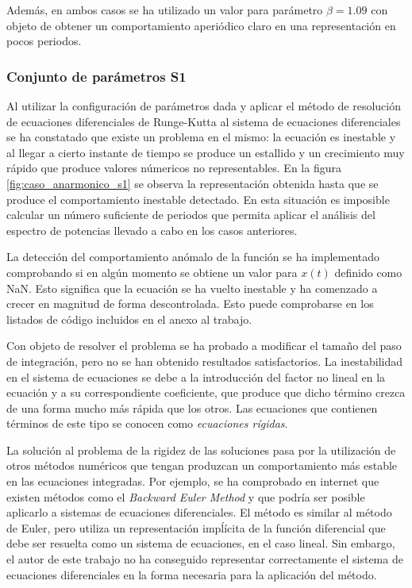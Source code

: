 \documentclass[11pt]{article}
\begin{document}
Además, en ambos casos se ha utilizado un valor para parámetro $\beta=1.09$ con objeto de obtener un comportamiento aperiódico claro en una representación en pocos periodos.

\subsubsection{Conjunto de parámetros S1}
Al utilizar la configuración de parámetros dada y aplicar el método de resolución de ecuaciones diferenciales de Runge-Kutta al sistema de ecuaciones diferenciales se ha constatado que existe un problema en el mismo: la ecuación es inestable y al llegar a cierto instante de tiempo se produce un estallido y un crecimiento muy rápido que produce valores númericos no representables. En la figura \ref{fig:caso_anarmonico_s1} se observa la representación obtenida hasta que se produce el comportamiento inestable detectado. En esta situación es imposible calcular un número suficiente de periodos que permita aplicar el análisis del espectro de potencias llevado a cabo en los casos anteriores.

La detección del comportamiento anómalo de la función se ha implementado comprobando si en algún momento se obtiene un valor para $x(t)$ definido como NaN. Esto significa que la ecuación se ha vuelto inestable y ha comenzado a crecer en magnitud de forma descontrolada. Esto puede comprobarse en los listados de código incluidos en el anexo al trabajo.

Con objeto de resolver el problema se ha probado a modificar el tamaño del paso de integración, pero no se han obtenido resultados satisfactorios. La inestabilidad en el sistema de ecuaciones se debe a la introducción del factor no lineal en la ecuación y a su correspondiente coeficiente, que produce que dicho término crezca de una forma mucho más rápida que los otros. Las ecuaciones que contienen términos de este tipo se conocen como \textit{ecuaciones rígidas}. 

La solución al problema de la rigidez de las soluciones pasa por la utilización de otros métodos numéricos que tengan produzcan un comportamiento más estable en las ecuaciones integradas. Por ejemplo, se ha comprobado en internet que existen métodos como el 
\textit{Backward Euler Method} y que podría ser posible aplicarlo a sistemas de ecuaciones diferenciales. El método es similar al método de Euler, pero utiliza un representación impĺícita de la función diferencial que debe ser resuelta como un sistema de ecuaciones, en el caso lineal. Sin embargo, el autor de este trabajo no ha conseguido representar correctamente el sistema de ecuaciones diferenciales en la forma necesaria para la aplicación del método. 
\end{document}
